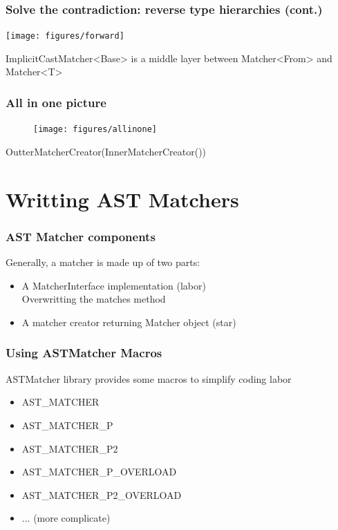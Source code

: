 \documentclass[]{beamer}
\begin{document}
\begin{frame}
  \frametitle{Solve the contradiction: reverse type hierarchies (cont.)}
  

  \pause
  \texttt{[image: figures/forward]}

  ImplicitCastMatcher<Base> is a middle layer between Matcher<From> and
  Matcher<T>
\end{frame}

\begin{frame}
  \frametitle{All in one picture}
  \begin{figure}
    \texttt{[image: figures/allinone]}
  \end{figure}
  \centerline{OutterMatcherCreator(InnerMatcherCreator())}
\end{frame}

\section{Writting AST Matchers}
\frame{\tableofcontents[currentsection]}

\begin{frame}
  \frametitle{AST Matcher components}
  Generally, a matcher is made up of two parts:
  \begin{itemize}
    \item A MatcherInterface implementation (labor)\\
      Overwritting the \alert{matches} method
    \item A matcher creator returning Matcher object (star)\\
  \end{itemize}
\end{frame}

\begin{frame}
  \frametitle{Using ASTMatcher Macros}
  ASTMatcher library provides some macros to simplify coding labor
  \begin{itemize}
    \item AST\_MATCHER
    \item AST\_MATCHER\_P
    \item AST\_MATCHER\_P2
    \item AST\_MATCHER\_P\_OVERLOAD
    \item AST\_MATCHER\_P2\_OVERLOAD
    \item ... (more complicate)
  \end{itemize}
\end{frame}
\end{document}

